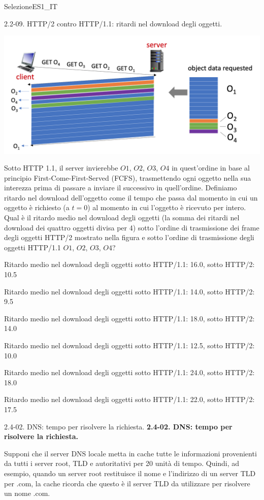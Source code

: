 \documentclass[a4paper]{article}
\begin{document}
\begin{quiz}{SelezioneES1\_IT}
\begin{multi}[points=1]{2.2-09. HTTP/2 contro HTTP/1.1: ritardi nel download degli oggetti.}
\begin{center}
\includegraphics[width=\linewidth]{figs/2.2.9.jpg}
\end{center}

Sotto HTTP 1.1, il server invierebbe $O1$, $O2$, $O3$, $O4$ in quest'ordine in base al principio First-Come-First-Served (FCFS), trasmettendo ogni oggetto nella sua interezza prima di passare a inviare il successivo in quell'ordine. Definiamo ritardo nel download dell'oggetto come il tempo che passa dal momento in cui un oggetto è richiesto (a $t=0$) al momento in cui l'oggetto è ricevuto per intero. Qual è il ritardo medio nel download degli oggetti (la somma dei ritardi nel download dei quattro oggetti divisa per 4) sotto l'ordine di trasmissione dei frame degli oggetti HTTP/2 mostrato nella figura e sotto l'ordine di trasmissione degli oggetti HTTP/1.1 $O1$, $O2$, $O3$, $O4$?
\item* Ritardo medio nel download degli oggetti sotto HTTP/1.1: 16.0, sotto HTTP/2: 10.5
\item Ritardo medio nel download degli oggetti sotto HTTP/1.1: 14.0, sotto HTTP/2: 9.5
\item Ritardo medio nel download degli oggetti sotto HTTP/1.1: 18.0, sotto HTTP/2: 14.0
\item Ritardo medio nel download degli oggetti sotto HTTP/1.1: 12.5, sotto HTTP/2: 10.0
\item Ritardo medio nel download degli oggetti sotto HTTP/1.1: 24.0, sotto HTTP/2: 18.0
\item Ritardo medio nel download degli oggetti sotto HTTP/1.1: 22.0, sotto HTTP/2: 17.5
\end{multi}

\begin{multi}[points=1,shuffle]{2.4-02. DNS: tempo per risolvere la richiesta.}
\textbf{2.4-02. DNS: tempo per risolvere la richiesta.}

Supponi che il server DNS locale metta in cache tutte le informazioni provenienti da tutti i server root, TLD e autoritativi per 20 unità di tempo. Quindi, ad esempio, quando un server root restituisce il nome e l'indirizzo di un server TLD per .com, la cache ricorda che questo è il server TLD da utilizzare per risolvere un nome .com.


\end{multi}
\end{quiz}
\end{document}
